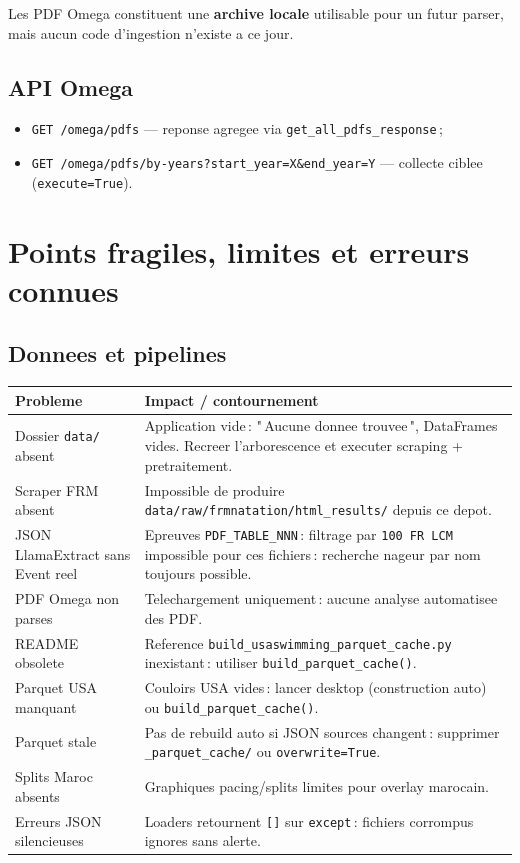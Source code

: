 \documentclass[11pt,a4paper]{article}
\begin{document}
Les PDF Omega constituent une \textbf{archive locale} utilisable pour un futur parser, mais aucun code d'ingestion n'existe a ce jour.

\subsection{API Omega}

\begin{itemize}
  \item \texttt{GET /omega/pdfs} --- reponse agregee via \texttt{get\_all\_pdfs\_response}\,;
  \item \texttt{GET /omega/pdfs/by-years?start\_year=X\&end\_year=Y} --- collecte ciblee (\texttt{execute=True}).
\end{itemize}

\section{Points fragiles, limites et erreurs connues}

\subsection{Donnees et pipelines}

\begin{longtable}{@{}p{}p{}@{}}
\toprule
\textbf{Probleme} & \textbf{Impact / contournement} \\
\midrule
\endhead
Dossier \texttt{data/} absent & Application vide\,: "\,Aucune donnee trouvee\,", DataFrames vides. Recreer l'arborescence et executer scraping + pretraitement. \\
Scraper FRM absent & Impossible de produire \texttt{data/raw/frmnatation/html\_results/} depuis ce depot. \\
JSON LlamaExtract sans Event reel & Epreuves \texttt{PDF\_TABLE\_NNN}\,: filtrage par \texttt{100 FR LCM} impossible pour ces fichiers\,: recherche nageur par nom toujours possible. \\
PDF Omega non parses & Telechargement uniquement\,: aucune analyse automatisee des PDF. \\
README obsolete & Reference \texttt{build\_usaswimming\_parquet\_cache.py} inexistant\,: utiliser \texttt{build\_parquet\_cache()}. \\
Parquet USA manquant & Couloirs USA vides\,: lancer desktop (construction auto) ou \texttt{build\_parquet\_cache()}. \\
Parquet stale & Pas de rebuild auto si JSON sources changent\,: supprimer \texttt{\_parquet\_cache/} ou \texttt{overwrite=True}. \\
Splits Maroc absents & Graphiques pacing/splits limites pour overlay marocain. \\
Erreurs JSON silencieuses & Loaders retournent \texttt{[]} sur \texttt{except}\,: fichiers corrompus ignores sans alerte. \\
\bottomrule
\end{longtable}
\end{document}
